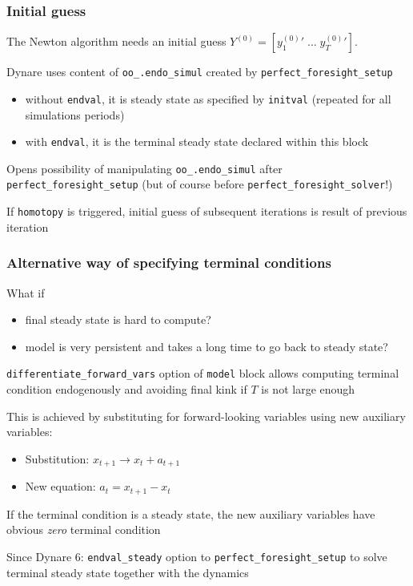 \documentclass[handout,usepdftitle=false,xcolor=dvipsnames,aspectratio=169]{beamer}
\begin{document}
\begin{frame}
  \frametitle{Initial guess}
  \begin{witemize}
    \item  The Newton algorithm needs an initial guess $Y^{(0)}= [ {y_1^{(0)}}'\;\ldots\;
      {y_T^{(0)}}' ]$.
    \item Dynare uses content of \texttt{oo\_.endo\_simul} created by \texttt{perfect\_foresight\_setup}
    \begin{itemize}
      \item without \texttt{endval}, it is steady state as specified by \texttt{initval} (repeated for all simulations periods)
      \item with \texttt{endval}, it is the terminal steady state declared within this block
    \end{itemize}
    \item Opens possibility of manipulating
    \texttt{oo\_.endo\_simul} after \texttt{perfect\_foresight\_setup} (but of
    course before \texttt{perfect\_foresight\_solver}!)
    \item If \texttt{homotopy} is triggered, initial guess of subsequent iterations
    is result of previous iteration
  \end{witemize}
\end{frame}

\begin{frame}
  \frametitle{Alternative way of specifying terminal conditions}
  \begin{witemize}
    \item What if
    \begin{itemize}
      \item final steady state is hard to compute?
      \item model is very persistent and takes a long time to go back to steady
            state?
    \end{itemize}
    \item \texttt{differentiate\_forward\_vars} option of \texttt{model} block allows computing terminal condition endogenously and avoiding final kink if
    $T$ is not large enough
    \item This is achieved by substituting for forward-looking variables using new auxiliary variables:
    \begin{itemize}
      \item Substitution: $x_{t+1} \rightarrow x_t + a_{t+1}$
      \item New equation: $a_t = x_{t+1} - x_t$
    \end{itemize}
    \item If the terminal condition is a steady state, the new auxiliary
    variables have obvious \emph{zero} terminal condition
    \item Since Dynare 6: \texttt{endval\_steady} option to \texttt{perfect\_foresight\_setup} to solve terminal steady state together with the dynamics
  \end{witemize}
\end{frame}
\end{document}
